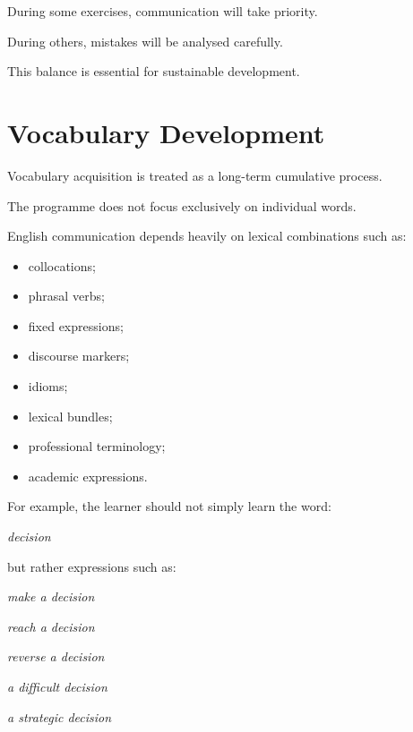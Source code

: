 During some exercises, communication will take priority.

During others, mistakes will be analysed carefully.

This balance is essential for sustainable development.

\section*{Vocabulary Development}

Vocabulary acquisition is treated as a long-term cumulative process.

The programme does not focus exclusively on individual words.

English communication depends heavily on lexical combinations such as:

\begin{itemize}
    \item collocations;
    \item phrasal verbs;
    \item fixed expressions;
    \item discourse markers;
    \item idioms;
    \item lexical bundles;
    \item professional terminology;
    \item academic expressions.
\end{itemize}

For example, the learner should not simply learn the word:

\begin{center}
\textit{decision}
\end{center}

but rather expressions such as:

\begin{center}
\textit{make a decision}
\end{center}

\begin{center}
\textit{reach a decision}
\end{center}

\begin{center}
\textit{reverse a decision}
\end{center}

\begin{center}
\textit{a difficult decision}
\end{center}

\begin{center}
\textit{a strategic decision}
\end{center}

